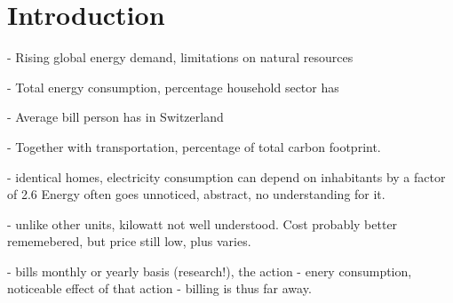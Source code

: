 \section{Introduction}
- Rising global energy demand, limitations on natural resources

- Total energy consumption, percentage household sector has

- Average bill person has in Switzerland

- Together with transportation, percentage of total carbon footprint. 


- identical homes, electricity consumption can depend on inhabitants by a factor of 2.6\cite{Froehlich_promotingenergy} 
Energy often goes unnoticed, abstract, no understanding for it.


- unlike other units, kilowatt not well understood\cite{Froehlich_promotingenergy}. Cost probably better rememebered, but price still low, plus varies.

- bills monthly or yearly basis (research!), the action - enery consumption, noticeable effect of that action - billing is thus far away. 